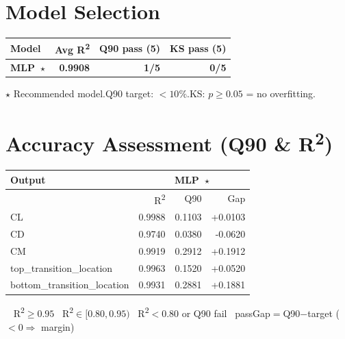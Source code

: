 \documentclass[9pt,a4paper]{article}
\begin{document}
\section{Model Selection}
\begin{minipage}{\linewidth}
\renewcommand{\arraystretch}{1.2}
\begin{tabular}{|l|r|r|r|}
  \hline
  \textbf{Model} & \textbf{Avg R\textsuperscript{2}} & \textbf{Q90 pass (5)} & \textbf{KS pass (5)} \\ \hline
  {\bfseries MLP\ $\star$} & {\bfseries 0.9908} & {\bfseries 1/5} & {\bfseries 0/5} \\ \hline
\end{tabular}
\par\vspace{4pt}
{\footnotesize $\star$ Recommended model.\enspace Q90 target: $<10\%$.\enspace KS: $p\geq 0.05$ = no overfitting.}
\end{minipage}

\section{Accuracy Assessment (Q90 \& R\textsuperscript{2})}
\begin{minipage}{\linewidth}
\renewcommand{\arraystretch}{1.2}
\begin{tabular}{l|rrr|}
  \hline
  \textbf{Output} & \multicolumn{3}{c|}{\textbf{MLP}\ $\star$} \\ \hline
  & R\textsuperscript{2} & Q90 & Gap \\ \hline
  CL & \cellcolor{r2green}0.9988 & \cellcolor{failred}0.1103 & \cellcolor{failred}+0.0103 \\ \hline
  CD & \cellcolor{r2green}0.9740 & \cellcolor{passgreen}0.0380 & \cellcolor{passgreen}-0.0620 \\ \hline
  CM & \cellcolor{r2green}0.9919 & \cellcolor{failred}0.2912 & \cellcolor{failred}+0.1912 \\ \hline
  top\_transition\_location & \cellcolor{r2green}0.9963 & \cellcolor{failred}0.1520 & \cellcolor{failred}+0.0520 \\ \hline
  bottom\_transition\_location & \cellcolor{r2green}0.9931 & \cellcolor{failred}0.2881 & \cellcolor{failred}+0.1881 \\ \hline
\end{tabular}
\par\vspace{4pt}
{\footnotesize \colorbox{r2green}{\ } R\textsuperscript{2}$\!\geq\!0.95$\enspace \colorbox{r2amber}{\ } R\textsuperscript{2}$\!\in[0.80,0.95)$\enspace \colorbox{failred}{\ } R\textsuperscript{2}$\!<\!0.80$ or Q90 fail\enspace \colorbox{passgreen}{\ } pass\enspace Gap$=$Q90$-$target ($<\!0\Rightarrow$ margin)}
\end{minipage}
\end{document}
